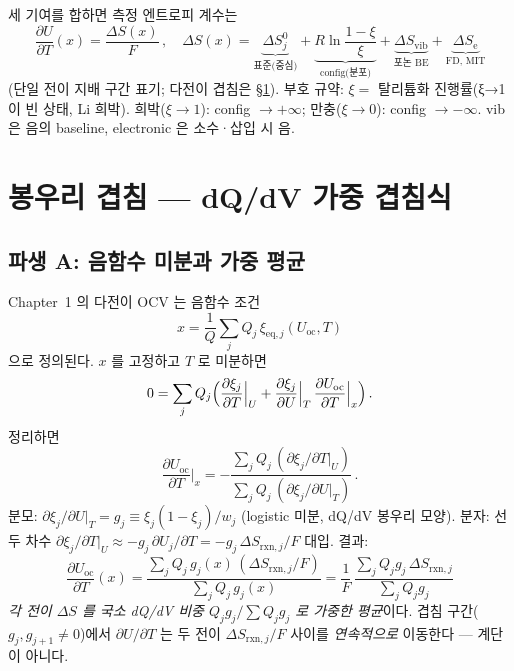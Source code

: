 \documentclass[11pt,a4paper]{article}
\newcommand{\rxn}{\mathrm{rxn}}
\newcommand{\eq}{\mathrm{eq}}
\newcommand{\oc}{\mathrm{oc}}
\newcommand{\vib}{\mathrm{vib}}
\newcommand{\elec}{\mathrm{e}}
\begin{document}
세 기여를 합하면 측정 엔트로피 계수는
\begin{equation}
  \boxed{\;
  \frac{\partial U}{\partial T}(x) = \frac{\Delta S(x)}{F}\,,\quad
  \Delta S(x) =
    \underbrace{\Delta S^0_j}_{\text{표준(중심)}}
    + \underbrace{R\ln\frac{1-\xi}{\xi}}_{\text{config(분포)}}
    + \underbrace{\Delta S_\vib}_{\text{포논 BE}}
    + \underbrace{\Delta S_\elec}_{\text{FD, MIT}}
  \;}
  \label{eq:Stotal}
\end{equation}
(단일 전이 지배 구간 표기; 다전이 겹침은 \S\ref{sec:mixing}).
부호 규약: $\xi=$ 탈리튬화 진행률(ξ→1이 빈 상태, Li 희박).
희박($\xi\to1$): config $\to+\infty$; 만충($\xi\to0$): config $\to-\infty$.
vib 은 음의 baseline, electronic 은 소수·삽입 시 음.

\section{봉우리 겹침 — dQ/dV 가중 겹침식}\label{sec:mixing}

\subsection{파생 A: 음함수 미분과 가중 평균}\label{sec:deriv_A}

Chapter~1 의 다전이 OCV 는 음함수 조건
\[
  x = \frac{1}{Q}\sum_j Q_j\,\xi_{\eq,j}(U_\oc,T)
\]
으로 정의된다. $x$ 를 고정하고 $T$ 로 미분하면
\[
  0 = \sum_j Q_j\Bigl(\frac{\partial\xi_j}{\partial T}\Big|_U
    + \frac{\partial\xi_j}{\partial U}\Big|_T\,\frac{\partial U_\oc}{\partial T}\Big|_x\Bigr)\,.
\]
정리하면
\begin{equation}
  \frac{\partial U_\oc}{\partial T}\Big|_x
  = -\frac{\sum_j Q_j\,(\partial\xi_j/\partial T|_U)}{\sum_j Q_j\,(\partial\xi_j/\partial U|_T)}\,.
  \label{eq:implicit_diff}
\end{equation}
분모: $\partial\xi_j/\partial U|_T=g_j\equiv\xi_j(1-\xi_j)/w_j$ (logistic 미분, dQ/dV 봉우리 모양).
분자: 선두 차수 $\partial\xi_j/\partial T|_U\approx -g_j\,\partial U_j/\partial T
=-g_j\,\Delta S_{\rxn,j}/F$ 대입. 결과:
\begin{equation}
  \boxed{\;
  \frac{\partial U_\oc}{\partial T}(x) =
  \frac{\sum_j Q_j\,g_j(x)\,(\Delta S_{\rxn,j}/F)}{\sum_j Q_j\,g_j(x)}
  = \frac{1}{F}\,\frac{\sum_j Q_j g_j\,\Delta S_{\rxn,j}}{\sum_j Q_j g_j}
  \;}
  \label{eq:weighted_dSdT}
\end{equation}
\emph{각 전이 $\Delta S$ 를 국소 dQ/dV 비중 $Q_jg_j/\sum Q_jg_j$ 로 가중한 평균}이다.
겹침 구간($g_j,g_{j+1}\ne0$)에서 $\partial U/\partial T$ 는 두 전이 $\Delta S_{\rxn,j}/F$ 사이를
\emph{연속적으로} 이동한다 --- 계단이 아니다.
\end{document}
